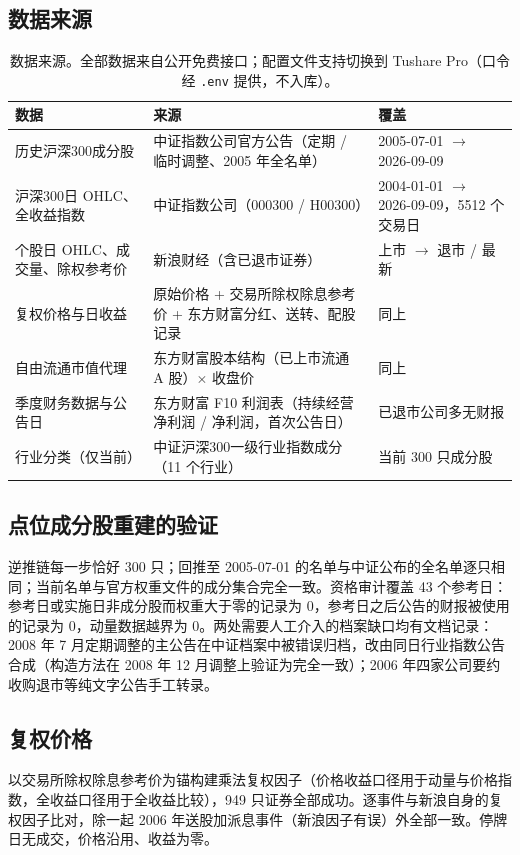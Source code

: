 \documentclass[11pt,a4paper]{article}
\begin{document}
\subsection{数据来源}
\begin{table}[!htbp]
\centering
\small
\caption{数据来源。全部数据来自公开免费接口；配置文件支持切换到 Tushare Pro（口令经 \texttt{.env} 提供，不入库）。}\label{tab:data}
\begin{tabular}{@{}p{3.6cm}p{7.2cm}p{4.2cm}@{}}
\toprule
数据 & 来源 & 覆盖 \\
\midrule
历史沪深300成分股 & 中证指数公司官方公告（定期 / 临时调整、2005 年全名单） & 2005-07-01 $\rightarrow$ 2026-09-09 \\
沪深300日 OHLC、全收益指数 & 中证指数公司（000300 / H00300） & 2004-01-01 $\rightarrow$ 2026-09-09，5512 个交易日 \\
个股日 OHLC、成交量、除权参考价 & 新浪财经（含已退市证券） & 上市 $\rightarrow$ 退市 / 最新 \\
复权价格与日收益 & 原始价格 + 交易所除权除息参考价 + 东方财富分红、送转、配股记录 & 同上 \\
自由流通市值代理 & 东方财富股本结构（已上市流通 A 股）$\times$ 收盘价 & 同上 \\
季度财务数据与公告日 & 东方财富 F10 利润表（持续经营净利润 / 净利润，首次公告日） & 已退市公司多无财报 \\
行业分类（仅当前） & 中证沪深300一级行业指数成分（11 个行业） & 当前 300 只成分股 \\
\bottomrule
\end{tabular}
\end{table}

\FloatBarrier
\subsection{点位成分股重建的验证}
逆推链每一步恰好 300 只；回推至 2005-07-01 的名单与中证公布的全名单逐只相同；当前名单与官方权重文件的成分集合完全一致。资格审计覆盖 43 个参考日：参考日或实施日非成分股而权重大于零的记录为 0，参考日之后公告的财报被使用的记录为 0，动量数据越界为 0。两处需要人工介入的档案缺口均有文档记录：2008 年 7 月定期调整的主公告在中证档案中被错误归档，改由同日行业指数公告合成（构造方法在 2008 年 12 月调整上验证为完全一致）；2006 年四家公司要约收购退市等纯文字公告手工转录。
\FloatBarrier
\subsection{复权价格}
以交易所除权除息参考价为锚构建乘法复权因子（价格收益口径用于动量与价格指数，全收益口径用于全收益比较），949 只证券全部成功。逐事件与新浪自身的复权因子比对，除一起 2006 年送股加派息事件（新浪因子有误）外全部一致。停牌日无成交，价格沿用、收益为零。
\FloatBarrier
\end{document}
